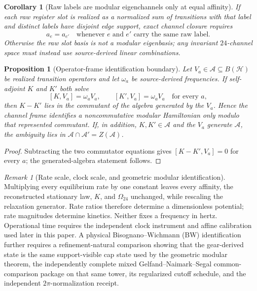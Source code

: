\documentclass[11pt]{article}
\newtheorem{corollary}[theorem]{Corollary}
\newtheorem{proposition}[theorem]{Proposition}
\theoremstyle{remark}
\newtheorem{remark}[theorem]{Remark}
\theoremstyle{plain}
\begin{document}
\begin{corollary}[Raw labels are modular eigenchannels only at equal affinity]
\label{cor:raw-label-modular-eigenchannel}
If each raw register slot is realized as a normalized sum of transitions with
that label and distinct labels have disjoint edge support, exact channel
closure requires
\[
 a_e=a_{e'}
 \quad\text{whenever \(e\) and \(e'\) carry the same raw label.}
\]
Otherwise the raw slot basis is not a modular eigenbasis; any invariant
\(24\)-channel space must instead use source-derived linear combinations.
\end{corollary}

\begin{proposition}[Operator-frame identification boundary]
\label{prop:operator-frame-identification}
Let \(V_a\in\mathcal A\subseteq B(\mathcal H)\) be realized transition
operators and let \(\omega_a\) be source-derived frequencies.  If self-adjoint
\(K\) and \(K'\) both solve
\[
 [K,V_a]=\omega_aV_a,
 \qquad
 [K',V_a]=\omega_aV_a
 \quad\text{for every \(a\)},
\]
then \(K-K'\) lies in the commutant of the algebra generated by the \(V_a\).
Hence the channel frame identifies a noncommutative modular Hamiltonian only
modulo that represented commutant.  If, in addition, \(K,K'\in\mathcal A\)
and the \(V_a\) generate \(\mathcal A\), the ambiguity lies in
\(\mathcal A\cap\mathcal A'=Z(\mathcal A)\).
\end{proposition}

\begin{proof}
Subtracting the two commutator equations gives
\([K-K',V_a]=0\) for every \(a\); the generated-algebra statement follows.
\end{proof}

\begin{remark}[Rate scale, clock scale, and geometric modular identification]
Multiplying every equilibrium rate by one constant leaves every affinity,
the reconstructed stationary law, \(K\), and \(\Omega_{24}\) unchanged, while
rescaling the relaxation generator.  Rate ratios therefore determine a
dimensionless potential; rate magnitudes determine kinetics.  Neither fixes a
frequency in hertz.  Operational time requires the independent clock
instrument and affine calibration used later in this paper. A physical
Bisognano--Wichmann (BW) identification further requires a
refinement-natural comparison showing that the
gear-derived state is the same support-visible cap state used by the geometric
modular theorem, the independently complete mixed
Gelfand--Naimark--Segal common-comparison package
on that same tower, its regularized cutoff schedule, and the independent
\(2\pi\)-normalization receipt.
\end{remark}
\end{document}
